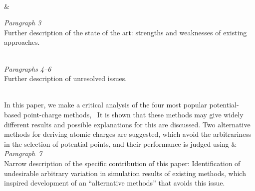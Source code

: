 \documentclass[11pt, a4paper, oneside]{article}
\newlength{\smalllinespacing}
\theoremstyle{Plain}
\theoremstyle{Definition}
\theoremstyle{Remark}
\begin{document}
\begin{longtblr}{}
{		\\
		\null\hspace{\smalllinespacing}\textellipsis
	}
	&
	{%
		\textit{Paragraph 3} \\
		Further description of the state of the art: strengths and weaknesses of existing approaches. \\
		\strut \\[2ex]
		\textit{Paragraphs 4--6} \\
		Further description of unresolved issues.
	}
	\\
	\hspace{\smalllinespacing}In this paper, we make a critical analysis of the four most popular potential-based point-charge methods, \textellipsis\ It is shown that these methods may give widely different results and possible explanations for this are discussed. Two alternative methods for deriving atomic charges are suggested, which avoid the arbitrariness in the selection of potential points, and their performance is judged using \textellipsis
	&
	{%
		\textit{Paragraph~7} \\
		Narrow description of the specific contribution of this paper: Identification of undesirable arbitrary variation in simulation results of existing methods, which inspired development of an ``alternative methods'' that avoids this issue.
	}
\end{longtblr}
\end{document}
